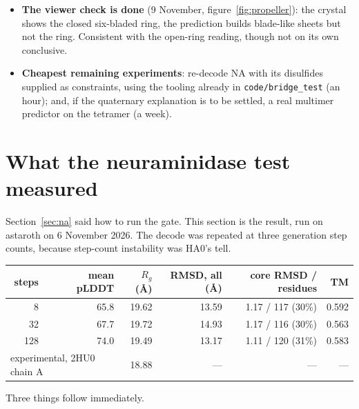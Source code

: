 \documentclass[11pt,a4paper]{article}
\newcommand{\file}[1]{\texttt{#1}}
\begin{document}
\begin{itemize}
        run on 8 November: a monomeric bacterial sialidase (NanH, 2SIL, 381
        residues), which has the \emph{same} six-bladed propeller fold as
        neuraminidase, is predicted well --- pLDDT 86, core 0.94\,\AA{} over 73\%
        of the chain, TM 0.895, and its C-terminal block lands at 0.83\,\AA, so
        the ring closes. Whatever defeats neuraminidase is specific to
        neuraminidase (section~\ref{sec:nanh}).
  \item \textbf{The viewer check is done} (9 November, figure~\ref{fig:propeller}):
        the crystal shows the closed six-bladed ring, the prediction builds blade-like
        sheets but not the ring. Consistent with the open-ring reading, though not
        on its own conclusive.
  \item \textbf{Cheapest remaining experiments}: re-decode NA with its disulfides supplied as
        constraints, using the tooling already in \file{code/bridge\_test} (an
        hour); and, if the quaternary explanation is to be settled, a real
        multimer predictor on the tetramer (a week).
\end{itemize}

\section{What the neuraminidase test measured}\label{sec:na-result}

Section~\ref{sec:na} said how to run the gate. This section is the result, run on
astaroth on 6 November 2026. The decode was repeated at three generation step
counts, because step-count instability was HA0's tell.

\begin{center}
\begin{tabular}{rrrrrr}
\toprule
steps & mean pLDDT & $R_g$ (\AA) & RMSD, all (\AA) & core RMSD / residues & TM \\
\midrule
8   & 65.8 & 19.62 & 13.59 & 1.17 / 117 (30\%) & 0.592 \\
32  & 67.7 & 19.72 & 14.93 & 1.17 / 116 (30\%) & 0.563 \\
128 & 74.0 & 19.49 & 13.17 & 1.11 / 120 (31\%) & 0.583 \\
\midrule
\multicolumn{2}{l}{experimental, 2HU0 chain A} & 18.88 & --- & --- & --- \\
\bottomrule
\end{tabular}
\end{center}

Three things follow immediately.
\end{document}
